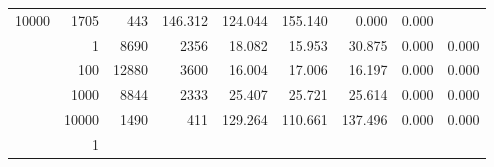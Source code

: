 \begin{table}
\begin{tabular}{rrrrrrrrr}
					\multirow{ 1 }{*}{ 10000 } &
					
						
							    
							     1705  & 443  
	                           & 146.312 & 124.044 & 155.140
	                           & 0.000 & 0.000  \\
	                
	            
	        
				\noalign{\smallskip}\hline
				\multirow{ 4 }{*}{ 1000000 } &
				
					
					 
					\multirow{ 1 }{*}{ 1 } &
					
						
							    
							     8690  & 2356  
	                           & 18.082 & 15.953 & 30.875
	                           & 0.000 & 0.000  \\
	                
	            
					 &  
					 
					\multirow{ 1 }{*}{ 100 } &
					
						
							    
							     12880  & 3600  
	                           & 16.004 & 17.006 & 16.197
	                           & 0.000 & 0.000  \\
	                
	            
					 &  
					 
					\multirow{ 1 }{*}{ 1000 } &
					
						
							    
							     8844  & 2333  
	                           & 25.407 & 25.721 & 25.614
	                           & 0.000 & 0.000  \\
	                
	            
					 &  
					 
					\multirow{ 1 }{*}{ 10000 } &
					
						
							    
							     1490  & 411  
	                           & 129.264 & 110.661 & 137.496
	                           & 0.000 & 0.000  \\
	                
	            
	        
				\noalign{\smallskip}\hline
				\multirow{ 4 }{*}{ 2000000 } &
				
					
					 
					\multirow{ 1 }{*}{ 1 } &
					

\end{tabular}
\end{table}
